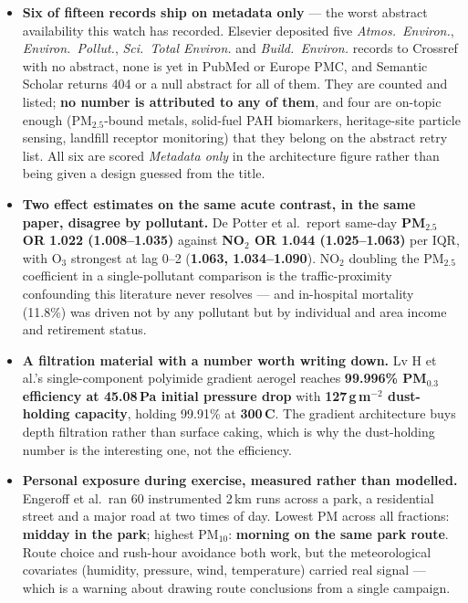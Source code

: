 \documentclass[10pt]{article}
\begin{document}
\footnotesize
\begin{itemize}
\item \textbf{Six of fifteen records ship on metadata only} --- the worst abstract
availability this watch has recorded. Elsevier deposited five \textit{Atmos.\ Environ.},
\textit{Environ.\ Pollut.}, \textit{Sci.\ Total Environ.} and \textit{Build.\ Environ.}
records to Crossref with no abstract, none is yet in PubMed or Europe PMC, and Semantic
Scholar returns 404 or a null abstract for all of them. They are counted and listed;
\textbf{no number is attributed to any of them}, and four are on-topic enough
(PM$_{2.5}$-bound metals, solid-fuel PAH biomarkers, heritage-site particle sensing,
landfill receptor monitoring) that they belong on the abstract retry list. All six are
scored \textit{Metadata only} in the architecture figure rather than being given a design
guessed from the title.

\item \textbf{Two effect estimates on the same acute contrast, in the same paper,
disagree by pollutant.} De Potter et al.\ report same-day \textbf{PM$_{2.5}$ OR 1.022
(1.008--1.035)} against \textbf{NO$_2$ OR 1.044 (1.025--1.063)} per IQR, with O$_3$
strongest at lag 0--2 (\textbf{1.063, 1.034--1.090}). NO$_2$ doubling the PM$_{2.5}$
coefficient in a single-pollutant comparison is the traffic-proximity confounding this
literature never resolves --- and in-hospital mortality (11.8\%) was driven not by any
pollutant but by individual and area income and retirement status.

\item \textbf{A filtration material with a number worth writing down.} Lv H et al.'s
single-component polyimide gradient aerogel reaches \textbf{99.996\% PM$_{0.3}$ efficiency
at 45.08\,Pa initial pressure drop} with \textbf{127\,g\,m$^{-2}$ dust-holding capacity},
holding 99.91\% at \textbf{300\,\textdegree C}. The gradient architecture buys depth
filtration rather than surface caking, which is why the dust-holding number is the
interesting one, not the efficiency.

\item \textbf{Personal exposure during exercise, measured rather than modelled.} Engeroff
et al.\ ran 60 instrumented 2\,km runs across a park, a residential street and a major
road at two times of day. Lowest PM across all fractions: \textbf{midday in the park};
highest PM$_{10}$: \textbf{morning on the same park route}. Route choice and rush-hour
avoidance both work, but the meteorological covariates (humidity, pressure, wind,
temperature) carried real signal --- which is a warning about drawing route conclusions
from a single campaign.


\end{itemize}
\end{document}
